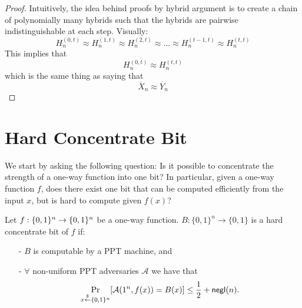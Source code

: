 \documentclass[12pt]{tufte-book}
\begin{document}
\begin{proof}
Intuitively, the idea behind proofs by hybrid argument is to create a chain of polynomially many hybrids such that the hybrids are pairwise indistinguishable at each step.
Visually:
$$H^{(0,t)}_n \approx H^{(1,t)}_n \approx H^{(2,t)}_n \approx ... \approx H^{(t-1,t)}_n \approx H^{(t,t)}_n$$
This implies that 
$$H^{(0,t)}_n \approx H^{(t,t)}_n$$
which is the same thing as saying that
$$\overline{X}_n \approx \overline{Y}_n$$


%
%
\end{proof}


\iffalse
\section{Hard Concentrate Bit}
We start by asking the following question: Is it possible to concentrate the strength of a one-way function into one bit? In particular, given a one-way function $f$, does there exist one bit that can be computed efficiently from the input $x$, but is hard to compute given $f(x)$?
\begin{definition}
Let $f:\{0,1\}^{n} \rightarrow \{0,1\}^{n}$ be a one-way function.
$B:\{0,1\}^n \rightarrow \{0,1\}$ is a hard concentrate bit of $f$ if:
\begin{itemize}
\item[-] $B$ is computable by a PPT machine, and
\item[-] $\forall$ non-uniform PPT adversaries $\mathcal{A}$ we have that
	$$\Pr_{x\stackrel{\$}{\leftarrow} \{0,1\}^{n}}[\mathcal{A}(1^n, f(x)) = B(x)] \leq \frac{1}{2} + \mathsf{negl}(n).$$
\end{itemize}
\end{definition}
\end{document}
